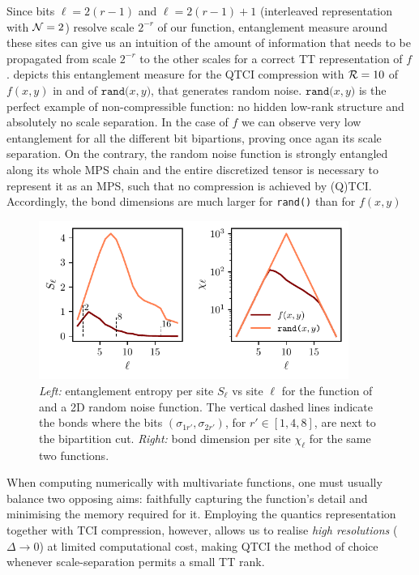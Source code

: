 \begin{example}
Since bits $\ell = 2(r-1)$ and $\ell = 2(r-1) + 1$ (interleaved representation with  $\mathcal{N} = 2$) resolve scale $2^{-r}$ of our function, entanglement measure around these sites can give us an intuition of the amount of information that needs to be propagated from scale $2^{-r}$ to the other scales for a correct TT representation of $f$.  depicts this entanglement measure for the QTCI compression with $\mathcal{R} = 10$ of $f(x,y)$ in  and of $\texttt{rand(}x,y\texttt{)}$, that generates random noise. $\texttt{rand(}x,y\texttt{)}$ is the perfect example of non-compressible function: no hidden low-rank structure and absolutely no scale separation. In the case of $f$ we can observe very low entanglement for all the different bit bipartions, proving once agan its scale separation. On the contrary, the random noise function is strongly entangled along its whole MPS chain and the entire discretized tensor is necessary to represent it as an MPS, such that no compression is achieved by (Q)TCI. Accordingly, the bond dimensions are much larger for \texttt{rand()} than for $f(x,y)$
	
\begin{figure}[htbp]
		\centering
		\includegraphics[width=0.9\textwidth]{figures/QTCI_ent_entropy+bonddims.pdf}
		\caption{ \textit{Left:} entanglement entropy per site $S_\ell$ vs site $\ell$ for the function of  and a 2D random noise function. The vertical dashed lines indicate the bonds where the bits $(\sigma_{1r'}, \sigma_{2r'})$, for $r' \in [1,4,8]$, are next to the bipartition cut. \textit{Right:} bond dimension per site $\chi_\ell$ for the same two functions.}
		\label{fig:QTCIEntanglement}
	\end{figure}
\end{example}
When computing numerically with multivariate functions, one must usually balance two opposing aims: faithfully capturing the function's detail and minimising the memory required for it. Employing the quantics representation together with TCI compression, however, allows us to realise \emph{high resolutions} (\(\Delta\!\to\!0\)) at limited computational cost, making QTCI the
method of choice whenever scale-separation permits a small TT rank.


